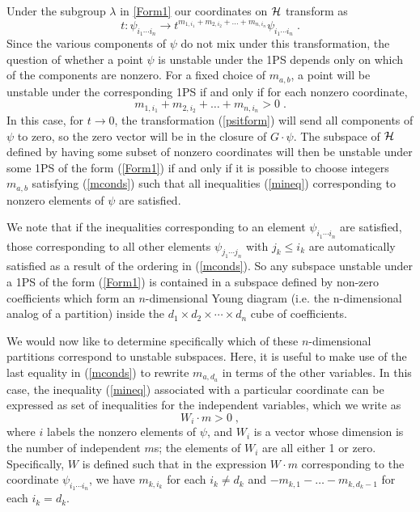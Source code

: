 \documentclass[12pt]{article}
\theoremstyle{definition}
\newcommand{\be}{\begin{equation}}
\newcommand{\ee}{\end{equation}}
\begin{document}
Under the subgroup $\lambda$ in \eqref{Form1} our coordinates on ${\cal H}$ transform as
\be
\label{psitform}
t \colon \psi_{i_1 \cdots i_n} \to t^{m_{1,i_1} + m_{2,i_2} + \dots + m_{n,i_n}} \psi_{i_1 \cdots i_n} \; .
\ee
Since the various components of $\psi$ do not mix under this transformation, the question of whether a point $\psi$ is unstable under the 1PS depends only on which of the components are nonzero.
For a fixed choice of $m_{a,b}$, a point will be unstable under the corresponding 1PS if and only if for each nonzero coordinate,
\be
\label{mineq}
m_{1,i_1} + m_{2,i_2} + \dots + m_{n,i_n} > 0 \; .
\ee
In this case, for $t \to 0$, the transformation (\ref{psitform}) will send all components of $\psi$ to zero, so the zero vector will be in the closure of $G \cdot \psi$. The subspace of ${\cal H}$ defined by having some subset of nonzero coordinates will then be unstable under some 1PS of the form (\ref{Form1}) if and only if it is possible to choose integers $m_{a,b}$ satisfying (\ref{mconds}) such that all inequalities (\ref{mineq}) corresponding to nonzero elements of $\psi$ are satisfied.

We note that if the inequalities corresponding to an element $\psi_{i_1 \cdots i_n}$ are satisfied, those corresponding to all other elements $\psi_{j_1 \cdots j_n}$ with $j_k \le i_k$ are automatically satisfied as a result of the ordering in (\ref{mconds}). So any subspace unstable under a 1PS of the form (\ref{Form1}) is contained in a subspace defined by non-zero coefficients which form an $n$-dimensional Young diagram (i.e. the n-dimensional analog of a partition) inside the $d_1 \times d_2 \times \cdots \times d_n$ cube of coefficients.

We would now like to determine specifically which of these $n$-dimensional partitions correspond to unstable subspaces. Here, it is useful to make use of the last equality in (\ref{mconds}) to rewrite $m_{a,d_a}$ in terms of the other variables. In this case, the inequality (\ref{mineq}) associated with a particular coordinate can be expressed as set of inequalities for the independent variables, which we write as
\be
\label{dotproduct}
W_i \cdot m > 0 \; ,
\ee
where $i$ labels the nonzero elements of $\psi$, and $W_i$ is a vector whose dimension is the number of independent $m$s; the elements of $W_i$ are all either 1 or zero. Specifically, $W$ is defined such that in the expression $W \cdot m$ corresponding to the coordinate $\psi_{i_1 \cdots i_n}$, we have $m_{k,i_k}$ for each $i_k \ne d_k$ and $-m_{k,1} - \dots - m_{k,d_k - 1}$ for each $i_k = d_k$.
\end{document}
